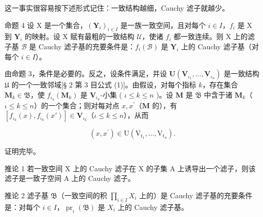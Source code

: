 这一事实很容易按下述形式记住：一致结构越细，Cauchy 滤子就越少。

命题 4 设 X 是一个集合，\((\mathbf{Y}_i)_{i\in I}\) 是一族一致空间，且对每个 \(i\in I\)，\(f_i\) 是 X 到 \(\mathbf{Y}_i\) 的映射。设 X 赋有最粗的一致结构 \(\mathcal{U}\)，使诸 \(f_i\) 都一致连续。则 X 上的滤子基 \(\mathcal{B}\) 是 Cauchy 滤子基的充要条件是：\(f_i(\mathcal{B})\) 是 \(\mathbf{Y}_i\) 上的 Cauchy 滤子基（对每个 \(i\in I\)）。

由命题 3，条件是必要的。反之，设条件满足，并设 \(\mathbf{U}(\mathbf{V}_{\iota_1},\ldots ,\mathbf{V}_{\iota_n})\) 是一致结构 \(\mathfrak{U}\) 的一个一致邻域{[}§ 2 第 3 目公式 (1){]}。由假设，对每个指标 \(k\)，存在集合 \(\mathbf{M}_k\in \mathfrak{B}\)，使 \(f_{\iota_k}(\mathbf{M}_k)\) 是 \(\mathbf{V}_{\iota_k}\)-小集 ( \(\iota \leqslant k\leqslant n\) )。设 \(\mathbf{M}\) 是 \(\mathfrak{B}\) 中含于诸 \(\mathbf{M}_k\)（\(\iota \leqslant k\leqslant n\)）的一个集合；则对每对点 \(x,x^{\prime}\)（\(\mathbf{M}\) 的），有 \([f_{\iota_k}(x),f_{\iota_k}(x')]\in \mathbf{V}_{\iota_k}\)（\(\iota \leqslant k\leqslant n\)），从而

\[
(x, x ^ {\prime}) \in \mathrm{U} (\mathrm{V} _ {t _ {1}}, \dots , \mathrm{V} _ {t _ {n}}).
\]

证明完毕。

推论 1 若一致空间 X 上的 Cauchy 滤子在 X 的子集 A 上诱导出一个滤子，则该滤子是一致子空间 A 上的 Cauchy 滤子。

推论 2 滤子基 \(\mathfrak{B}\)（一致空间的积 \(\prod_{i\in I}X_i\) 上的）是 Cauchy 滤子基的充要条件是：对每个 \(i\in I\)，\(\operatorname{pr}_i(\mathfrak{B})\) 是 \(X_i\) 上的 Cauchy 滤子基。

